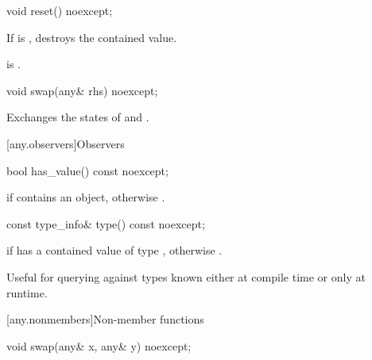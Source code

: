 %
\begin{itemdecl}
void reset() noexcept;
\end{itemdecl}

\begin{itemdescr}
\pnum
\effects
If  is , destroys the contained value.

\pnum
\postconditions
{} is .
\end{itemdescr}

%
\begin{itemdecl}
void swap(any& rhs) noexcept;
\end{itemdecl}

\begin{itemdescr}

\pnum
\effects
Exchanges the states of  and .
\end{itemdescr}

[any.observers]{Observers}

%
\begin{itemdecl}
bool has_value() const noexcept;
\end{itemdecl}

\begin{itemdescr}
\pnum
\returns
{} if  contains an object, otherwise .
\end{itemdescr}

%
\begin{itemdecl}
const type_info& type() const noexcept;
\end{itemdecl}

\begin{itemdescr}
\pnum
\returns
{} if  has a contained value of type ,
otherwise .

\pnum
\begin{note}
Useful for querying against types known either at compile time or only at runtime.
\end{note}
\end{itemdescr}

[any.nonmembers]{Non-member functions}

%
\begin{itemdecl}
void swap(any& x, any& y) noexcept;
\end{itemdecl}


